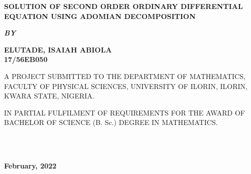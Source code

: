 \documentclass[11pt]{report}
\newcommand{\bt}[1]{\textbf{#1}}
\begin{document}
	
	\clearpage
	\thispagestyle{empty}
	\begin{center}
		\Large \bt{SOLUTION OF SECOND ORDER ORDINARY DIFFERENTIAL EQUATION USING ADOMIAN DECOMPOSITION}
	\end{center}

	\hspace{7cm}
	
	\begin{center}
		\textbf{\textit{BY}}
	\end{center}
	
	\hspace{5cm}
	
	\begin{center}
		\large \textbf{ELUTADE, ISAIAH ABIOLA
			\\
			17/56EB050}
	\end{center}
	
	\hspace{9cm}
	
	\begin{center}
		A PROJECT SUBMITTED TO THE DEPARTMENT OF MATHEMATICS, FACULTY OF PHYSICAL SCIENCES, UNIVERSITY OF ILORIN, ILORIN, KWARA STATE, NIGERIA.
	\end{center}

	\hspace{7cm}
	
	\begin{center}
		IN PARTIAL FULFILMENT OF REQUIREMENTS FOR THE AWARD OF BACHELOR OF SCIENCE (B. Sc.) DEGREE IN MATHEMATICS.
	\end{center}
	\hspace{5cm}
	\\ \\ 
	\begin{center}
		\textbf{February, 2022}
	\end{center}

	\newpage
\end{document}
